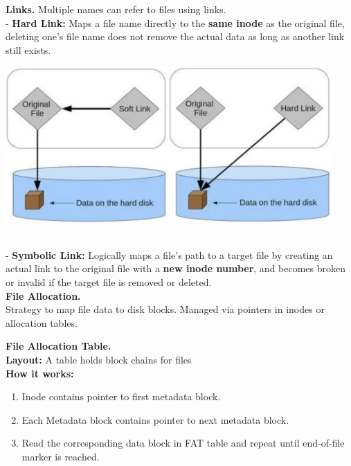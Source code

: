 \documentclass[8pt]{extarticle}
\begin{document}
\small
\begin{minipage}[htp]{0.5\textwidth}

    \begin{minipage}[htp]{0.45\textwidth}
    \textbf{Links.} Multiple names can refer to files using links.\\
- \textbf{Hard Link:} Maps a file name directly to the \textbf{same inode} as the original file, deleting one's file name does not remove the actual data as long as another link still exists.
    \end{minipage}
    \hfill
    \begin{minipage}[htp]{0.55\textwidth}
        \includegraphics[width=0.93\textwidth]{images/soft-hard.png}
    \end{minipage}\\
- \textbf{Symbolic Link:} Logically maps a file's path to a target file by creating an actual link to the original file with a \textbf{new inode number}, and becomes broken or invalid if the target file is removed or deleted.\\
\noindent\textbf{File Allocation.} \\
Strategy to map file data to disk blocks. Managed via pointers in inodes or allocation tables.\\[2px]
\begin{minipage}[htp]{0.49\textwidth}
\noindent\textbf{File Allocation Table.}\\
\textbf{Layout:} A table holds block chains for files\\
\textbf{How it works:}
\begin{enumerate}[noitemsep,nolistsep,topsep=0px,partopsep=0pt,parsep=0pt]
    \item Inode contains pointer to first metadata block.
    \item Each Metadata block contains pointer to next metadata block.
    \item Read the corresponding data block in FAT table and repeat until end-of-file marker is reached.
\end{enumerate}


\end{minipage}
\end{minipage}
\end{document}
